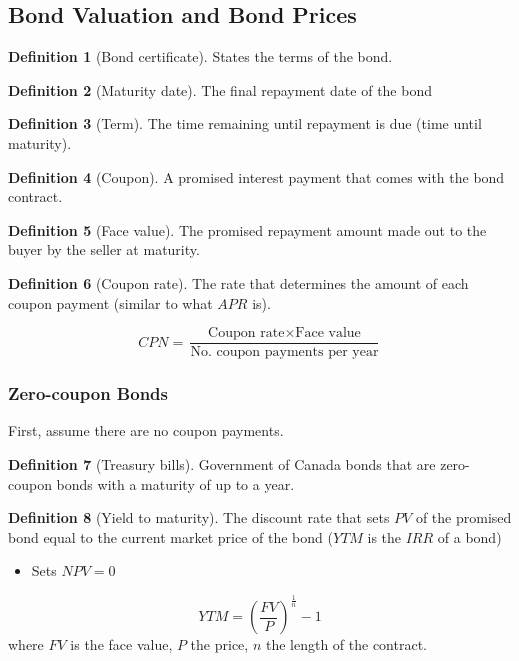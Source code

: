 \documentclass[11pt]{article}
\theoremstyle{definition}
\newtheorem*{definition}{Definition}
\begin{document}
\subsection{Bond Valuation and Bond Prices}
\begin{definition}[Bond certificate]
    States the terms of the bond.
\end{definition}
\begin{definition}[Maturity date]
    The final repayment date of the bond
\end{definition}
\begin{definition}[Term]
    The time remaining until repayment is due (time until maturity).    
\end{definition}
\begin{definition}[Coupon]
    A promised interest payment that comes with the bond contract.
\end{definition}
\begin{definition}[Face value]
    The promised repayment amount made out to the buyer by the seller at maturity.
\end{definition}
\begin{definition}[Coupon rate]
    The rate that determines the amount of each coupon payment (similar to what $APR$ is).
\end{definition}

\begin{equation*}
    CPN = \frac{\text{Coupon rate} \times \text{Face value}}{\text{No. coupon payments per year}}
\end{equation*}

\subsubsection{Zero-coupon Bonds}
First, assume there are no coupon payments. 
\begin{definition}[Treasury bills]
    Government of Canada bonds that are zero-coupon bonds with a maturity of up to a year.
\end{definition}

\begin{definition}[Yield to maturity]
    The discount rate that sets $PV$ of the promised bond equal to the current market price of the bond ($YTM$ is the $IRR$ of a bond)
    \begin{itemize}
        \item Sets $NPV = 0$
    \end{itemize}
    \begin{equation*}
        YTM = \left(\frac{FV}{P}\right)^{\frac{1}{n}} - 1
    \end{equation*}
    where $FV$ is the face value, $P$ the price, $n$ the length of the contract.
\end{definition}
\end{document}
